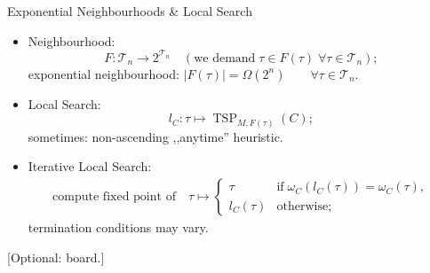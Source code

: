 \documentclass[
  size=8pt,
  style=klope,
  paper=screen,
  pauseslide,
  nopagebreaks,
  hlsections,
  fleqn
]{powerdot}
\def\board{{\color{green} [Optional: board.]}}
\begin{document}
\begin{slide}{Exponential Neighbourhoods \& Local Search}
\begin{itemize}
  \item
  Neighbourhood:
  \begin{equation}
    F: \mathcal{T}_n \to 2^{\mathcal{T}_n}
    \quad \left(\text{we demand}\; \tau \in F\left(\tau\right) \; \forall \tau \in \mathcal{T}_n\right);
  \end{equation}
  exponential neighbourhood:
  $\left\vert F(\tau) \right\vert = \Omega(2^n) \qquad \forall \tau \in \mathcal{T}_n$.
  \item
  Local Search:
  \begin{equation}
    l_C: \tau \mapsto \operatorname{TSP}_{M,F(\tau)}\left(C\right);
  \end{equation}
  sometimes: non-ascending ,,anytime'' heuristic.
  \item
  Iterative Local Search:
  \begin{align}
    \text{compute fixed point of}
    \quad
    \tau \mapsto
    \begin{cases}
      \tau \quad & \text{if} \; \omega_C\left(l_C\left(\tau\right)\right) = \omega_C\left(\tau\right),
      \\
      l_C\left(\tau\right) & \text{otherwise};
    \end{cases}
  \end{align}
  termination conditions may vary.
\end{itemize}
\board
\end{slide}
\end{document}
